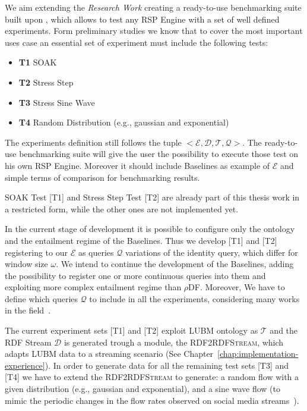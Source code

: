 \noindent We aim extending the \textit{Research Work} creating a ready-to-use benchmarking suite built upon \namens, which allows to test any RSP Engine with a set of well defined experiments. Form preliminary studies we know that to cover the most important uses case an essential set of experiment must include the following tests:
\begin{itemize}
\item \textbf{T1} SOAK
\item \textbf{T2} Stress Step
\item \textbf{T3} Stress Sine Wave
\item \textbf{T4} Random Distribution (e.g., gaussian and exponential)
\end{itemize}

The experiments definition still follows the tuple $<\mathcal{E},\mathcal{D},\mathcal{T},\mathcal{Q}>$. The ready-to-use benchmarking suite will give the user the possibility to execute those test on his own RSP Engine. Moreover it should include \name Baselines as example of $\mathcal{E}$ and simple terms of comparison for benchmarking results.

SOAK Test [T1] and Stress Step Test [T2] are already part of this thesis work in a restricted form, while the other ones are not implemented yet. 

In the current stage of development it is possible to configure only the ontology and the entailment regime of the Baselines. Thus we develop [T1] and [T2] registering to our $\mathcal{E}$ as queries $\mathcal{Q}$ variations of the identity query, which differ for window size $\omega$. We intend to continue the development of the Baselines, adding the possibility to register one or more continuous queries into them and exploiting more complex entailment regime than $\rho$DF. Moreover, We have to define which queries $\mathcal{Q}$ to include in all the experiments, considering many works in the field~\cite{DBLP:conf/esws/ScharrenbachUMVB13, Zhang2012, LePhuoc2012c, DBLP:conf/semweb/DellAglioCBCV13}.

The current experiment sets [T1] and [T2] exploit LUBM ontology as $\mathcal{T}$ and the RDF Stream $\mathcal{D}$ is generated trough a module, the \textsc{RDF2RDFStream}, which adapts LUBM data to a streaming scenario (See Chapter~\ref{chap:implementation-experience}). In order to generate data for all the remaining test sets [T3] and [T4] we have to extend the \textsc{RDF2RDFStream} to generate: a random flow with a given distribution (e.g., gaussian and exponential), and a sine wave flow (to mimic the periodic changes in the flow rates observed on social media streams~\cite{DBLP:conf/semweb/BalduiniVDTPC13}).

